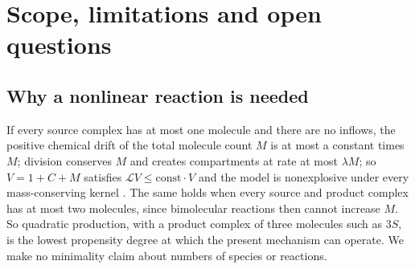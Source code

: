 \documentclass[11pt,a4paper]{article}
\numberwithin{equation}{section}
\theoremstyle{definition}\newtheorem{definition}[theorem]{Definition}
\theoremstyle{remark}\newtheorem{remark}[theorem]{Remark}\newtheorem{example}[theorem]{Example}
\begin{document}
\section{Scope, limitations and open questions}\label{sec:scope}

\subsection{Why a nonlinear reaction is needed}
If every source complex has at most one molecule and there are no inflows, the positive chemical drift of the total molecule count $M$ is at most a constant times $M$; division conserves $M$ and creates compartments at rate at most $\lambda M$; so $V=1+C+M$ satisfies $\mathcal LV\le\mathrm{const}\cdot V$ and the model is nonexplosive under every mass-conserving kernel \cite[Theorem~3.1]{AHRLL2026}. The same holds when every source and product complex has at most two molecules, since bimolecular reactions then cannot increase $M$. So quadratic production, with a product complex of three molecules such as $3S$, is the lowest propensity degree at which the present mechanism can operate. We make no minimality claim about numbers of species or reactions.
\end{document}
